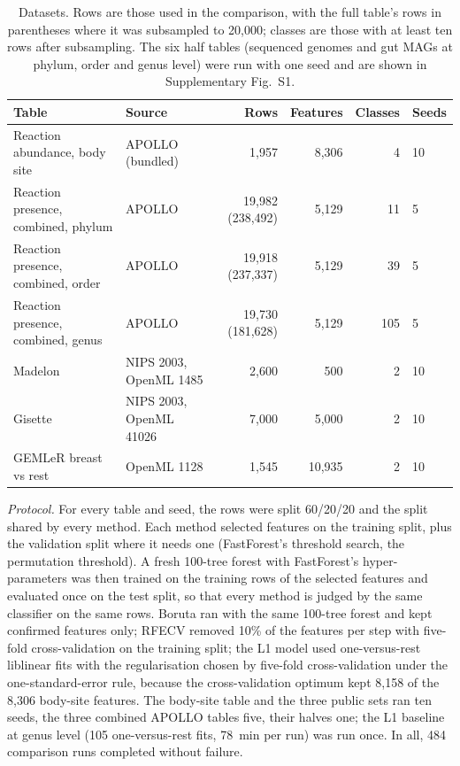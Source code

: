 \documentclass[11pt,a4paper]{article}
\begin{document}
\begin{table}[tbp]
\small
\caption{Datasets. Rows are those used in the comparison, with the full table's rows in parentheses where it was subsampled to 20,000; classes are those with at least ten rows after subsampling. The six half tables (sequenced genomes and gut MAGs at phylum, order and genus level) were run with one seed and are shown in Supplementary Fig.~S1.}
\label{tab:datasets}
\begin{tabular}{P{4.6cm}P{3.4cm}rrrl}
\toprule
\textbf{Table} & \textbf{Source} & \textbf{Rows} & \textbf{Features} & \textbf{Classes} & \textbf{Seeds} \\
\midrule
Reaction abundance, body site & APOLLO (bundled) & 1,957 & 8,306 & 4 & 10 \\
Reaction presence, combined, phylum & APOLLO \cite{heinken2025} & 19,982 (238,492) & 5,129 & 11 & 5 \\
Reaction presence, combined, order & APOLLO & 19,918 (237,337) & 5,129 & 39 & 5 \\
Reaction presence, combined, genus & APOLLO & 19,730 (181,628) & 5,129 & 105 & 5 \\
Madelon & NIPS 2003, OpenML 1485 & 2,600 & 500 & 2 & 10 \\
Gisette & NIPS 2003, OpenML 41026 & 7,000 & 5,000 & 2 & 10 \\
GEMLeR breast vs rest & OpenML 1128 & 1,545 & 10,935 & 2 & 10 \\
\bottomrule
\end{tabular}
\end{table}

\emph{Protocol.} For every table and seed, the rows were split 60/20/20 and the split shared by every method. Each method selected features on the training split, plus the validation split where it needs one (FastForest's threshold search, the permutation threshold). A fresh 100-tree forest with FastForest's hyper-parameters was then trained on the training rows of the selected features and evaluated once on the test split, so that every method is judged by the same classifier on the same rows. Boruta ran with the same 100-tree forest and kept confirmed features only; RFECV removed 10\% of the features per step with five-fold cross-validation on the training split; the L1 model used one-versus-rest liblinear fits with the regularisation chosen by five-fold cross-validation under the one-standard-error rule, because the cross-validation optimum kept 8,158 of the 8,306 body-site features. The body-site table and the three public sets ran ten seeds, the three combined APOLLO tables five, their halves one; the L1 baseline at genus level (105 one-versus-rest fits, 78~min per run) was run once. In all, 484 comparison runs completed without failure.
\end{document}
